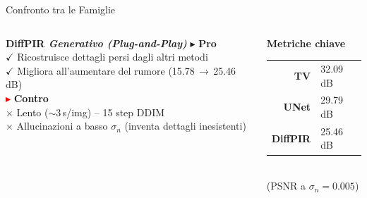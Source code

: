 \documentclass[italian,10pt]{beamer}
\begin{document}
\begin{frame}{Confronto tra le Famiglie}
  \vspace{0.25cm}

  \begin{columns}[t]
      {%
      \begin{block}{\small\bfseries DiffPIR  \hfill \scriptsize\itshape Generativo (Plug-and-Play)}
        \scriptsize
        \textcolor{green!50!black}{$\blacktriangleright$} \textbf{Pro}\\[0.05cm]
        \hspace{0.3cm}$\checkmark$ Ricostruisce dettagli persi dagli altri metodi\\
        \hspace{0.3cm}$\checkmark$ Migliora all'aumentare del rumore (15.78\,$\to$\,25.46\,dB)\\[0.08cm]
        \textcolor{red}{$\blacktriangleright$} \textbf{Contro}\\[0.05cm]
        \hspace{0.3cm}$\times$  Lento ($\sim$3\,s/img) -- 15 step DDIM\\
        \hspace{0.3cm}$\times$  Allucinazioni a basso $\sigma_n$ (inventa dettagli inesistenti)
      \end{block}}
      \begin{center}
        \textbf{Metriche chiave}\\[0.15cm]
        \begin{tabular}{rl}\small
          \textbf{TV} & 32.09\,dB\\
          \textbf{UNet} & 29.79\,dB\\
          \textbf{DiffPIR} & 25.46\,dB\\
        \end{tabular}\\[0.1cm]
        \scriptsize (PSNR a $\sigma_n=0.005$)
      \end{center}
  \end{columns}
\end{frame}
\end{document}
